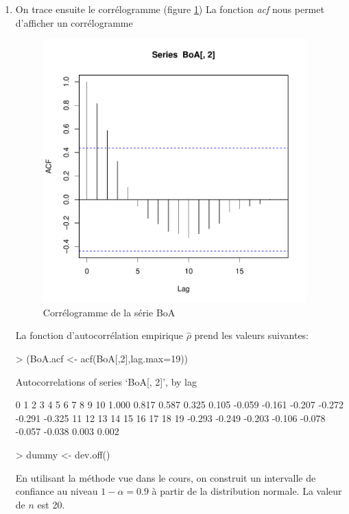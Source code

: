 \documentclass{article}
\begin{document}
\begin{enumerate}
\item 
  On trace ensuite le corrélogramme (figure \ref{fig:exercice1.6-graph1})
  La fonction \emph{acf} nous permet d'afficher un corrélogramme
\begin{figure}[p]
  \centering
  \includegraphics[height=4in, width=4in]{exercice1-6-graph1}
  \caption{Corrélogramme de la série BoA}
  \label{fig:exercice1.6-graph1}
\end{figure}

La fonction d'autocorrélation empirique $\hat{\rho}$ prend les valeurs 
suivantes:
\begin{Schunk}
\begin{Sinput}
> (BoA.acf <- acf(BoA[,2],lag.max=19))
\end{Sinput}
\begin{Soutput}
Autocorrelations of series ‘BoA[, 2]’, by lag

     0      1      2      3      4      5      6      7      8      9     10 
 1.000  0.817  0.587  0.325  0.105 -0.059 -0.161 -0.207 -0.272 -0.291 -0.325 
    11     12     13     14     15     16     17     18     19 
-0.293 -0.249 -0.203 -0.106 -0.078 -0.057 -0.038  0.003  0.002 
\end{Soutput}
\begin{Sinput}
> dummy <- dev.off()
\end{Sinput}
\end{Schunk}

En utilisant la méthode vue dans le cours, on construit un intervalle de 
confiance au niveau $1-\alpha=0.9$ à partir de la distribution normale. La 
valeur de $n$ est 20.


\end{enumerate}
\end{document}
